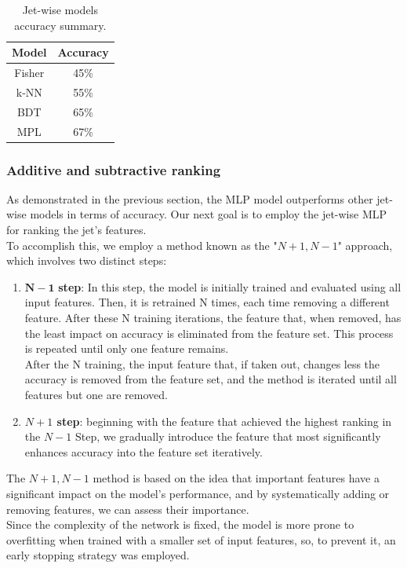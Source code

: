 


\begin{table}[H]
    \centering
    \begin{tabular}{c|c}
    \toprule
        \textbf{Model} & \textbf{Accuracy} \\
        \midrule
        Fisher & 45\%\\
        k-NN & 55\%\\
        BDT  & 65\%\\
        MPL  & 67\%\\
    \end{tabular}
    \caption{Jet-wise models accuracy summary.}
    \label{tab:jet_wise_summary}
\end{table}
\subsubsection*{Additive and subtractive ranking}
As demonstrated in the previous section, the MLP model outperforms other jet-wise models in terms of accuracy.
Our next goal is to employ the jet-wise MLP for ranking the jet's features.\\
To accomplish this, we employ a method known as the "$N+1, N-1$" approach, which involves two distinct steps:
\begin{enumerate}
    \item $\bm{N-1}$ \textbf{step}: In this step, the model is initially trained and evaluated using all input features. Then, it is retrained N times, each time removing a different feature. After these N training iterations, the feature that, when removed, has the least impact on accuracy is eliminated from the feature set. This process is repeated until only one feature remains.\\
    After the N training, the input feature that, if taken out, changes less the accuracy is removed from the feature set, and the method is iterated until all features but one are removed.
    \item \textbf{$N+1$ step}: beginning with the feature that achieved the highest ranking in the $N-1$ Step, we gradually introduce the feature that most significantly enhances accuracy into the feature set iteratively.
\end{enumerate}
The $N+1,N-1$ method is based on the idea that important features have a significant impact on the model's performance, and by systematically adding or removing features, we can assess their importance.\\
Since the complexity of the network is fixed, the model is more prone to overfitting when trained with a smaller set of input features, so, to prevent it, an early stopping strategy was employed.



